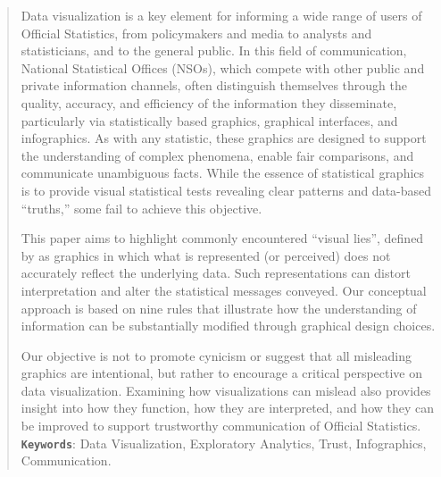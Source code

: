 \documentclass[11pt,twoside,a4paper]{article}
\begin{document}
\begin{abstract}
    Data visualization is a key element for informing a wide range of users of Official Statistics, from policymakers and media to analysts and statisticians, and to the general public. In this field of communication, National Statistical Offices (NSOs), which compete with other public and private information channels, often distinguish themselves through the quality, accuracy, and efficiency of the information they disseminate, particularly via statistically based graphics, graphical interfaces, and infographics. As with any statistic, these graphics are designed to support the understanding of complex phenomena, enable fair comparisons, and communicate unambiguous facts. While the essence of statistical graphics is to provide visual statistical tests revealing clear patterns and data-based “truths,” some fail to achieve this objective.

    This paper aims to highlight commonly encountered “visual lies”, defined by \cite{Tufte2001} as graphics in which what is represented (or perceived) does not accurately reflect the underlying data. Such representations can distort interpretation and alter the statistical messages conveyed. Our conceptual approach is based on nine rules that illustrate how the understanding of information can be substantially modified through graphical design choices.

    Our objective is not to promote cynicism or suggest that all misleading graphics are intentional, but rather to encourage a critical perspective on data visualization. Examining how visualizations can mislead also provides insight into how they function, how they are interpreted, and how they can be improved to support trustworthy communication of Official Statistics.\\

    \textbf{\texttt{Keywords}}: Data Visualization, Exploratory Analytics, Trust,  Infographics, Communication.
\end{abstract}

\newpage
\end{document}
